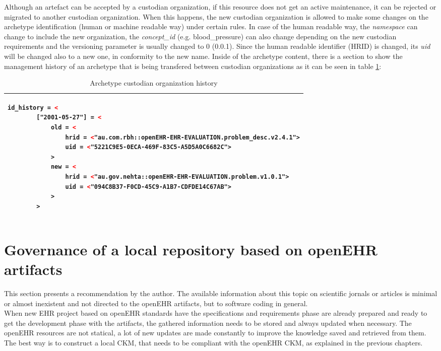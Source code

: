\documentclass[mim_thesis.tex]{subfiles}
\begin{document}
Although an artefact can be accepted by a custodian organization, if this resource does not get an active maintenance, it can be rejected or migrated to another custodian organization. When this happens, the new custodian organization is allowed to make some changes on the archetype identification (human or machine readable way) under certain rules. In case of the human readable way, the \textit{namespace} can change to include the new organization, the \textit{concept\_id} (e.g. blood\_pressure) can also change depending on the new custodian requirements and the versioning parameter is usually changed to 0 (0.0.1). Since the human readable identifier (HRID) is changed, its \textit{uid} will be changed also to a new one, in conformity to the new name. Inside of the archetype content, there is a section to show the management history of an archetype that is being transfered between custodian organizations as it can be seen in table \ref{tab:arch_co_h}:

\begin{table}[H]
\caption{Archetype custodian organization history \citep{openehrckmgover2018}}
\label{tab:arch_co_h}
\centering
\begin{tabular}{l}
\toprule[2pt]
\begin{lstlisting}[language=XML]
    id_history = <
        ["2001-05-27"] = <
            old = <
                hrid = <"au.com.rbh::openEHR-EHR-EVALUATION.problem_desc.v2.4.1">
                uid = <"5221C9E5-0ECA-469F-83C5-A5D5A0C6682C">
            >
            new = <
                hrid = <"au.gov.nehta::openEHR-EHR-EVALUATION.problem.v1.0.1">
                uid = <"094C8B37-F0CD-45C9-A1B7-CDFDE14C67AB">
            >
        >
\end{lstlisting}
\tabularnewline \bottomrule[2pt]
\end{tabular}
\end{table}


\newpage
\section{Governance of a local repository based on openEHR artifacts}

This section presents a recommendation by the author. The available information about this topic on scientific jornals or articles is minimal or almost inexistent and not directed to the openEHR artifacts, but to software coding in general. \\

When new EHR project based on openEHR standards have the specifications and requirements phase are already prepared and ready to get the development phase with the artifacts, the gathered information needs to be stored and always updated when necessary. The openEHR resources are not statical, a lot of new updates are made constantly to improve the knowledge saved and retrieved from them. The best way is to construct a local CKM, that needs to be compliant with the openEHR CKM, as explained in the previous chapters. \\ 
\end{document}
